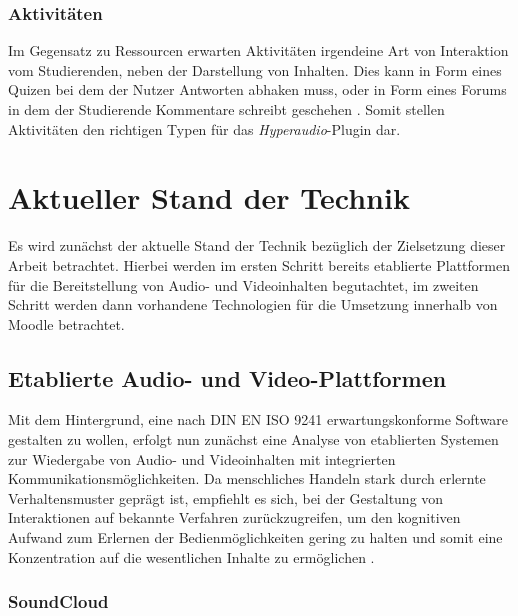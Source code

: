\subsubsection{Aktivitäten}
Im Gegensatz zu Ressourcen erwarten Aktivitäten irgendeine Art von Interaktion vom Studierenden, neben der Darstellung von Inhalten. Dies kann in Form eines Quizen bei dem der Nutzer Antworten abhaken muss, oder in Form eines Forums in dem der Studierende Kommentare schreibt geschehen \citep{wild2017moodle}. Somit stellen Aktivitäten den richtigen Typen für das \textit{Hyperaudio}-Plugin dar.


\section{Aktueller Stand der Technik}
Es wird zunächst der aktuelle Stand der Technik bezüglich der Zielsetzung dieser Arbeit betrachtet. Hierbei werden im ersten Schritt bereits etablierte Plattformen für die Bereitstellung von Audio- und Videoinhalten begutachtet, im zweiten Schritt werden dann vorhandene Technologien für die Umsetzung innerhalb von Moodle betrachtet.


\subsection{Etablierte Audio- und Video-Plattformen}

Mit dem Hintergrund, eine nach DIN EN ISO 9241 erwartungskonforme Software gestalten zu wollen, erfolgt nun zunächst eine Analyse von etablierten Systemen zur Wiedergabe von Audio- und Videoinhalten mit integrierten Kommunikationsmöglichkeiten. Da menschliches Handeln stark durch erlernte Verhaltensmuster geprägt ist, empfiehlt es sich, bei der Gestaltung von Interaktionen auf bekannte Verfahren zurückzugreifen, um den kognitiven Aufwand zum Erlernen der Bedienmöglichkeiten gering zu halten und somit eine Konzentration auf die wesentlichen Inhalte zu ermöglichen \citep{erwartungskonformitaet}.


\subsubsection{SoundCloud}

